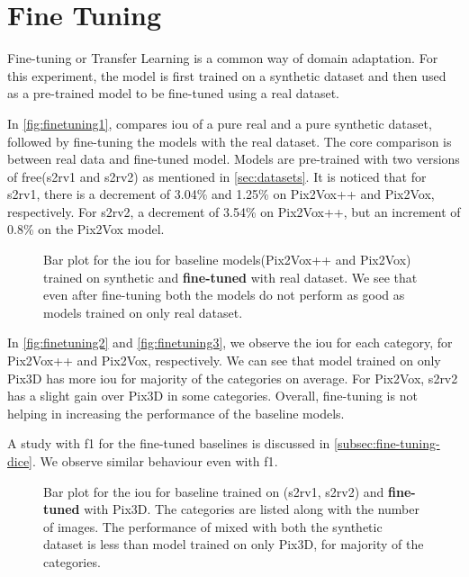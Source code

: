 \section{Fine Tuning}\label{sec:fine-tuning}
Fine-tuning or Transfer Learning is a common way of domain adaptation.
For this experiment, the model is first trained on a synthetic dataset and then used as a pre-trained model to be fine-tuned using a real dataset.

In \autoref{fig:finetuning1}, compares \gls{iou} of a pure real and a pure synthetic dataset, followed by fine-tuning the models with the real dataset.
The core comparison is between real data and fine-tuned model.
Models are pre-trained with two versions of \gls{free}(\gls{s2rv1} and \gls{s2rv2}) as mentioned in \autoref{sec:datasets}.
It is noticed that for \gls{s2rv1}, there is a decrement of 3.04\% and 1.25\% on Pix2Vox++ and Pix2Vox, respectively.
For \gls{s2rv2}, a decrement of 3.54\% on Pix2Vox++, but an increment of 0.8\% on the Pix2Vox model.

\begin{figure}[ht]
    \centering
    \resizebox{0.75\textwidth}{!}{}
    \caption[\gls{iou} Comparison for Fine-Tuned Baselines.]{Bar plot for the \gls{iou} for baseline models(Pix2Vox++ and Pix2Vox) trained on synthetic and \textbf{fine-tuned} with real dataset.
    We see that even after fine-tuning both the models do not perform as good as models trained on only real dataset.}
    \label{fig:finetuning1}
\end{figure}

In \autoref{fig:finetuning2} and \autoref{fig:finetuning3}, we observe the \gls{iou} for each category, for Pix2Vox++ and Pix2Vox, respectively.
We can see that model trained on only Pix3D has more \gls{iou} for majority of the categories on average.
For Pix2Vox, \gls{s2rv2} has a slight gain over Pix3D in some categories.
Overall, fine-tuning is not helping in increasing the performance of the baseline models.

A study with \gls{f1} for the fine-tuned baselines is discussed in \autoref{subsec:fine-tuning-dice}.
We observe similar behaviour even with \gls{f1}.

\begin{figure}[!ht]
    \centering
    \resizebox{0.65\textwidth}{!}{}
    \caption[\gls{iou} Comparison for Each Category from Fine-Tuned Pix2Vox++.]{Bar plot for the \gls{iou} for baseline  trained on (\gls{s2rv1}, \gls{s2rv2}) and \textbf{fine-tuned} with Pix3D.
    The categories are listed along with the number of images.
    The performance of  mixed with both the synthetic dataset is less than model trained on only Pix3D, for majority of the categories.}
    \label{fig:finetuning2}
\end{figure}

